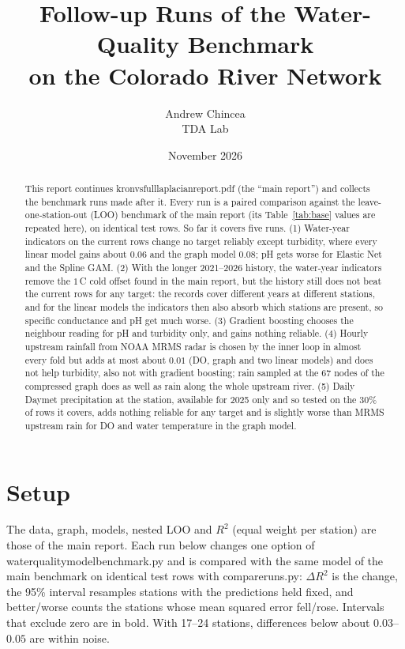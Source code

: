 \documentclass[11pt]{article}
\title{Follow-up Runs of the Water-Quality Benchmark\\
       on the Colorado River Network}
\author{Andrew Chincea \\ TDA Lab}
\date{November 2026}
\newcommand{\codeus}{\textunderscore\allowbreak}
\newcommand{\code}[1]{{\ttfamily\let\_\codeus #1}}
\begin{document}
\maketitle

\begin{abstract}
This report continues \code{kron\_vs\_full\_laplacian\_report.pdf} (the ``main report'') and collects
the benchmark runs made after it. Every run is a paired comparison against the leave-one-station-out
(LOO) benchmark of the main report (its Table~\ref{tab:base} values are repeated here), on identical
test rows. So far it covers five runs. (1) Water-year indicators on the current rows change no
target reliably except turbidity, where every linear model gains about $0.06$ and the graph model
$0.08$; pH gets worse for Elastic Net and the Spline GAM. (2) With the longer 2021--2026 history,
the water-year indicators remove the $1$\,\textdegree C cold offset found in the main report, but
the history still does not beat the current rows for any target: the records cover different years
at different stations, and for the linear models the indicators then also absorb which stations are
present, so specific conductance and pH get much worse. (3) Gradient boosting chooses the
neighbour reading for pH and turbidity only, and gains nothing reliable. (4) Hourly upstream rainfall
from NOAA MRMS radar is chosen by the inner loop in almost every fold but adds at most about $0.01$
(DO, graph and two linear models) and does not help turbidity, also not with gradient boosting; rain sampled at the 67 nodes of the
compressed graph does as well as rain along the whole upstream river. (5) Daily Daymet
precipitation at the station, available for 2025 only and so tested on the $30\%$ of rows it covers,
adds nothing reliable for any target and is slightly worse than MRMS upstream rain for DO and water
temperature in the graph model.
\end{abstract}

\section{Setup}

The data, graph, models, nested LOO and $R^2$ (equal weight per station) are those of the main
report. Each run below changes one option of \code{water\_quality\_model\_benchmark.py} and is compared
with the same model of the main benchmark on identical test rows with \code{compare\_runs.py}:
$\Delta R^2$ is the change, the 95\% interval resamples stations with the predictions held fixed, and
better/worse counts the stations whose mean squared error fell/rose. Intervals that exclude zero are
in bold. With 17--24 stations, differences below about $0.03$--$0.05$ are within noise.
\end{document}
